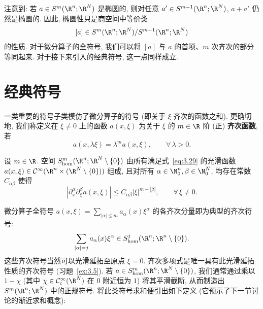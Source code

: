 注意到: 若 $a \in S^m(\R^n; \R^N)$ 是椭圆的, 则对任意 $a' \in S^{m-1}(\R^n; \R^N)$, $a + a'$ 仍然是椭圆的. 因此, 椭圆性只是商空间中等价类
\begin{equation}\label{eq:3.28}
    [a] \in S^m(\R^n; \R^N) / S^{m-1}(\R^n; \R^N)
\end{equation}
的性质. 对于微分算子的全符号, 我们可以将 $[a]$ 与 $a$ 的首项、$m$ 次齐次的部分等同起来. 对于接下来引入的经典符号, 这一点同样成立.

\section{经典符号}\label{sec:3.3}
%
%

一类重要的符号子类模仿了微分算子的符号 (即关于 $\xi$ 齐次的函数之和). 更确切地, 我们称定义在 $\xi \neq 0$ 上的函数 $a(x, \xi)$ 为关于 $\xi$ 的 $m \in \R$ 阶 (正) \textbf{齐次函数}, 若
\begin{equation}\label{eq:3.29}
    a(x, \lambda \xi) = \lambda^m a(x, \xi), \qquad \forall\,\lambda > 0.
\end{equation}

\begin{definition}[齐次符号空间]\label{def:3.13}
设 $m \in \R$. 空间 $S_{\mathrm{hom}}^m(\R^n; \R^N \setminus \{0\})$ 由所有满足式~\eqref{eq:3.29} 的光滑函数 $a(x, \xi) \in \mathcal{C}^\infty(\R^n \times (\R^N \setminus \{0\}))$ 组成, 且对所有 $\alpha \in \N_0^n, \beta \in \N_0^N$, 均存在常数 $C_{\alpha\beta}$ 使得
\begin{equation}\label{eq:3.30}
    |\partial_x^\alpha \partial_\xi^\beta a(x, \xi)| \le C_{\alpha\beta} |\xi|^{m - |\beta|}, \qquad \forall\,\xi \neq 0.
\end{equation}
\end{definition}

微分算子全符号 $a(x, \xi) = \sum_{|\alpha| \le m} a_\alpha(x) \xi^\alpha$ 的各齐次分量即为典型的齐次符号:
\begin{equation}\label{eq:3.31}
    \sum_{|\alpha| = j} a_\alpha(x) \xi^\alpha \in S_{\mathrm{hom}}^j(\R^n; \R^n \setminus \{0\}).
\end{equation}
这些齐次符号当然可以光滑延拓至原点 $\xi = 0$. 齐次多项式是唯一具有此光滑延拓性质的齐次符号 (习题~\ref{ex:3.5}). 若 $a \in S_{\mathrm{hom}}^m(\R^n; \R^N \setminus \{0\})$, 我们通常通过乘以 $1 - \chi$ (其中 $\chi \in \SmoothComp(\R^N)$ 在 $0$ 附近恒为 $1$) 将其平滑截断, 从而制造出 $S^m(\R^n; \R^N)$ 中的正规符号. 将此类符号求和便引出如下定义 (它预示了下一节讨论的渐近求和概念):

